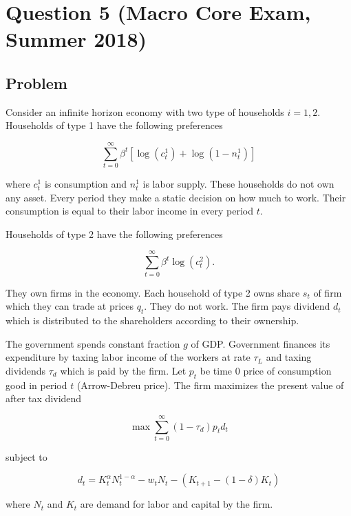 \documentclass[10pt, a4paper]{article}
\begin{document}
\section*{Question 5 (Macro Core Exam, Summer 2018)}
  \subsection*{Problem}
    Consider an infinite horizon economy with two type of households $i = 1,2$. Households of type 1 have the following preferences

    \[\sum_{t=0}^{\infty} \beta^t [\log(c_t^1) + \log(1-n_t^1)]\]

    where $c_t^1$ is consumption and $n_t^1$ is labor supply. These households do not own any asset. Every period they make a static decision on how much to work. Their consumption is equal to their labor income in every period $t$.

    Households of type 2 have the following preferences

    \[\sum_{t=0}^{\infty} \beta^t \log(c_t^2).\]

    They own firms in the economy. Each household of type 2 owns share $s_t$ of firm which they can trade at prices $q_t$. They do not work. The firm pays dividend $d_t$ which is distributed to the shareholders according to their ownership.

    The government spends constant fraction $g$ of GDP. Government finances its expenditure by taxing labor income of the workers at rate $\tau_L$ and taxing dividends $\tau_d$ which is paid by the firm. Let $p_t$ be time 0 price of consumption good in period $t$ (Arrow-Debreu price). The firm maximizes the present value of after tax dividend

    \[\max \sum_{t=0}^{\infty} (1-\tau_d)p_t d_t\]

    subject to

    \[d_t = K_t^\alpha N_t^{1-\alpha} - w_t N_t - (K_{t+1} - (1-\delta)K_t)\]

    where $N_t$ and $K_t$ are demand for labor and capital by the firm.
\end{document}
